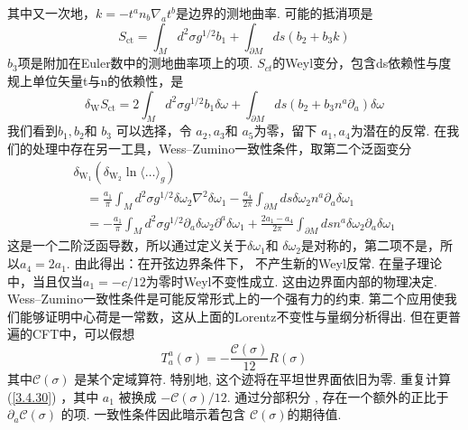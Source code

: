 其中又一次地，$k=-t^{a} n_{b} \nabla_{a} t^{b}$是边界的测地曲率. 可能的抵消项是
\begin{equation}
	S_{\mathrm{ct}}=\int_{M} d^{2} \sigma g^{1 / 2} b_{1}+\int_{\partial M} d s\left(b_{2}+b_{3} k\right)
\end{equation}
$b_3$项是附加在Euler数中的测地曲率项上的项. $S_{ct}$的Weyl变分，包含ds依赖性与度规上单位矢量t与n的依赖性，是
\begin{equation}
	\delta_{\mathrm{W}} S_{\mathrm{ct}}=2 \int_{M} d^{2} \sigma g^{1 / 2} b_{1} \delta \omega+\int_{\partial M} d s\left(b_{2}+b_{3} n^{a} \partial_{a}\right) \delta \omega
\end{equation}
我们看到$b_{1}, b_{2}$和 $b_{3}$ 可以选择，令 $a_{2}, a_{3}$和 $a_{5}$为零，留下 $a_{1}, a_{4}$为潜在的反常. 在我们的处理中存在另一工具，Wess–Zumino一致性条件，取第二个泛函变分
\begin{equation}\label{3.4.30}
	\begin{array}{l}
		\delta_{\mathrm{W}_{1}}\left(\delta_{\mathrm{W}_{2}} \ln \langle\ldots\rangle_{g}\right) \\
		\quad=\frac{a_{1}}{\pi} \int_{M} d^{2} \sigma g^{1 / 2} \delta \omega_{2} \nabla^{2} \delta \omega_{1}-\frac{a_{4}}{2 \pi} \int_{\partial M} d s \delta \omega_{2} n^{a} \partial_{a} \delta \omega_{1} \\
		\quad=-\frac{a_{1}}{\pi} \int_{M} d^{2} \sigma g^{1 / 2} \partial_{a} \delta \omega_{2} \partial^{a} \delta \omega_{1}+\frac{2 a_{1}-a_{4}}{2 \pi} \int_{\partial M} d s n^{a} \delta \omega_{2} \partial_{a} \delta \omega_{1}
	\end{array}
\end{equation}
这是一个二阶泛函导数，所以通过定义关于$\delta \omega_{1}$和 $\delta \omega_{2}$是对称的，第二项不是，所以$a_4=2a_1$. 由此得出：在开弦边界条件下， 不产生新的Weyl反常. 在量子理论中，当且仅当$a_{1}=-c / 12$为零时Weyl不变性成立. 这由边界面内部的物理决定. \\
Wess–Zumino一致性条件是可能反常形式上的一个强有力的约束. 第二个应用使我们能够证明中心荷是一常数，这从上面的Lorentz不变性与量纲分析得出. 但在更普遍的CFT中，可以假想
\begin{equation}
T_{a}^{a}(\sigma)=-\frac{\mathscr{C}(\sigma)}{12} R(\sigma)
\end{equation}
其中$\mathscr{C}(\sigma)$ 是某个定域算符. 特别地, 这个迹将在平坦世界面依旧为零. 重复计算 (\ref{3.4.30}) ，其中 $a_{1}$ 被换成 $-\mathscr{C}(\sigma) / 12$. 通过分部积分 , 存在一个额外的正比于 $\partial_{a} \mathscr{C}(\sigma)$ 的项. 一致性条件因此暗示着包含 $\mathscr{C}(\sigma)$的期待值.

